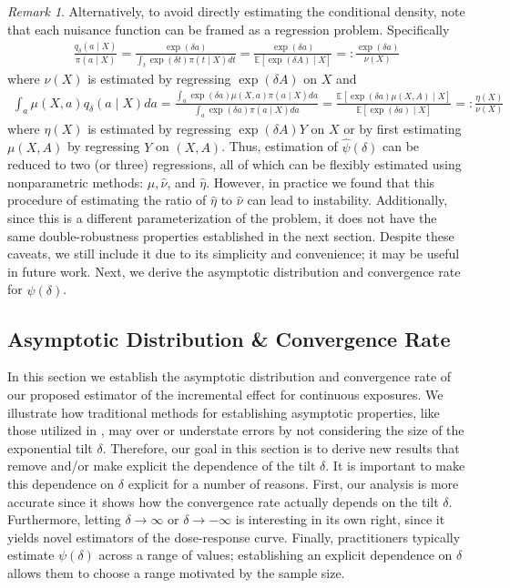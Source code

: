 \documentclass[11pt,twoside]{article}
\theoremstyle{definition}
\theoremstyle{remark}
\newtheorem{remark}{Remark}
\begin{document}
\begin{remark}
    Alternatively, to avoid directly estimating the conditional density,  note that each nuisance function can be framed as a regression problem. Specifically
\begin{align*}
    \frac{q_\delta(a \mid X)}{\pi(a \mid X)} = \frac{\exp(\delta a)}{\int_t \exp(\delta t) \pi(t \mid X) dt} = \frac{\exp(\delta a)}{\mathbb{E}\left[\exp(\delta A) \mid X \right]} =: \frac{\exp(\delta a)}{\nu(X)}
\end{align*}
where $\nu(X)$ is estimated by regressing $\exp(\delta A)$ on $X$ and
\begin{align*}
    \int_a \mu(X, a) q_\delta(a \mid X) da = \frac{\int_a \exp(\delta a) \mu(X, a) \pi(a \mid X) da}{\int_a \exp(\delta a) \pi(a \mid X) da} = \frac{\mathbb{E}\left[\exp(\delta a) \mu(X, A) \mid X \right]}{\mathbb{E}\left[ \exp(\delta a) \mid X\right]} =: \frac{\eta(X)}{\nu(X)}
\end{align*}
where $\eta(X)$ is estimated by regressing $\exp(\delta A) Y$ on $X$ or by first estimating $\mu(X, A)$ by regressing $Y$ on $(X, A)$. Thus, estimation of $\widehat{\psi}(\delta)$ can be reduced to two (or three) regressions, all of which can be flexibly estimated using nonparametric methods: $\widehat{\mu}, \widehat{\nu}$, and $\widehat{\eta}$. However, in practice we found that this procedure of estimating the ratio of $\widehat{\eta}$ to $\widehat{\nu}$ can lead to instability. Additionally, since this is a different parameterization of the problem, it does not have the same double-robustness properties established in the next section. Despite these caveats, we still include it  due to its simplicity and convenience; it may be useful in future work. Next, we derive the asymptotic distribution and convergence rate for $\widehat{\psi}(\delta)$.
\end{remark}



\subsection{Asymptotic Distribution \& Convergence Rate}

In this section we establish the asymptotic distribution and convergence rate of our proposed estimator of the incremental effect for continuous exposures. We illustrate how traditional methods for establishing asymptotic properties, like those utilized in \cite{diaz2020causal}, may over or understate errors by not considering the size of the exponential tilt  $\delta$. Therefore, our goal in this section is to derive new results that remove and/or make explicit the dependence of the tilt $\delta$. It is important to make this dependence on $\delta$ 
 explicit for a number of reasons. First, our analysis is more accurate since it shows how the convergence rate actually depends on the tilt $\delta$. Furthermore, letting $\delta \to \infty$ or $\delta \to -\infty$ is interesting in its own right, since it yields novel estimators of the dose-response curve. Finally,  practitioners typically estimate $\psi(\delta)$ across a range of values; establishing an explicit dependence on $\delta$ allows them to choose a range motivated by the sample size. 
\end{document}
